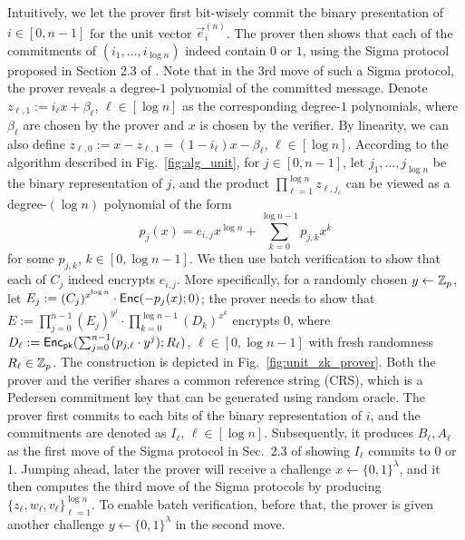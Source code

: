  Intuitively, we let the prover first bit-wisely commit the binary presentation of $i\in[0,n-1]$ for the unit vector $\vec{e}_i^{(n)}$. The prover then shows that each of the commitments of $(i_1,\ldots, i_{\log n})$ indeed contain $0$ or $1$, using the Sigma protocol proposed in Section 2.3 of \cite{Groth2015}. Note that in the 3rd move of such a Sigma protocol, the prover reveals a degree-$1$ polynomial of the committed message.  Denote $z_{\ell,1}:=i_\ell x + \beta_\ell$, $\ell\in[\log n]$ as the corresponding degree-$1$ polynomials, where $\beta_\ell$ are chosen by the prover and $x$ is chosen by the verifier. By linearity, we can also define $z_{\ell,0}:= x - z_{\ell,1 }= (1-i_\ell) x -\beta_\ell$, $\ell\in[\log n]$.  According to the algorithm described in Fig.~\ref{fig:alg_unit}, for $j\in[0,n-1]$, let  $j_1,\ldots, j_{\log n}$ be the binary representation of $j$, and the product $\prod_{\ell=1}^{\log n} z_{\ell, j_\ell}$ can be viewed as a degree-$(\log n)$ polynomial of the form
$$
p_j(x) = e_{i,j} x^{\log n} + \sum_{k=0}^{\log n -1} p_{j,k} x^k 
$$
for some $p_{j,k}$, $k\in[0,\log n -1]$. We then use batch verification to show that each of $C_j$ indeed encrypts $e_{i,j}$. More specifically, for a randomly chosen $y\leftarrow \mathbb{Z}_p$, let $E_j:=(C_j )^{x^{\log n}} \cdot \mathsf{Enc}(-p_j(x);0)$; the prover needs to show that $E:= \prod_{j=0}^{n-1} (E_j) ^{y^j} \cdot \prod_{k=0}^{\log n -1} (D_k) ^{x^k}$ encrypts $0$, where $D_\ell:= \mathsf{Enc}_{\mathsf{pk}}(\sum_{j=0}^{n-1} (p_{j,\ell} \cdot y^j) ; R_{\ell})$, $\ell\in[0,\log n -1]$ with fresh randomness $R_\ell\in\mathbb{Z}_p$. The construction is depicted in Fig.~\ref{fig:unit_zk_prover}. Both the prover and the verifier shares a common reference string (CRS), which is a Pedersen commitment key that can be generated using random oracle. %
The prover first commits to each bits of the binary representation of $i$, and the commitments are denoted as $I_\ell$, $\ell\in[\log n]$. Subsequently, it produces $B_\ell,A_\ell$ as the first move of the Sigma protocol in Sec.~2.3 of \cite{Groth2015} showing $I_\ell$ commits to $0$ or $1$. Jumping ahead, later the prover will receive a challenge $x\leftarrow \{0,1\}^\lambda$, and it then computes the third move of the Sigma protocols by producing $\{z_\ell,w_\ell,v_\ell\}_{\ell=1}^{\log n}$. To enable batch verification, before that, the prover is given another challenge $y\leftarrow \{0,1\}^\lambda$ in the second move. 

